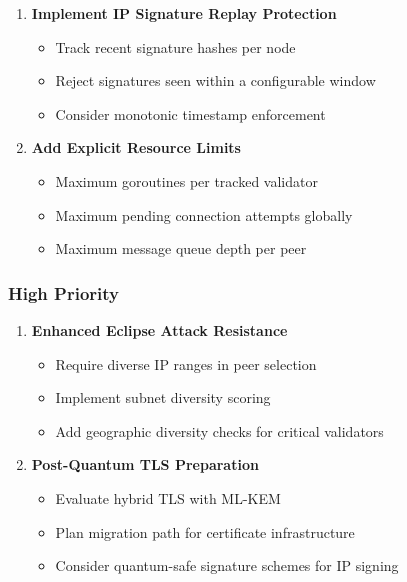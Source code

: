 \documentclass[
]{article}
\providecommand{\tightlist}{%
  \setlength{\itemsep}{0pt}\setlength{\parskip}{0pt}}
\begin{document}
\begin{enumerate}
\def\labelenumi{\arabic{enumi}.}
\item
  \textbf{Implement IP Signature Replay Protection}

  \begin{itemize}
  \tightlist
  \item
    Track recent signature hashes per node
  \item
    Reject signatures seen within a configurable window
  \item
    Consider monotonic timestamp enforcement
  \end{itemize}
\item
  \textbf{Add Explicit Resource Limits}

  \begin{itemize}
  \tightlist
  \item
    Maximum goroutines per tracked validator
  \item
    Maximum pending connection attempts globally
  \item
    Maximum message queue depth per peer
  \end{itemize}
\end{enumerate}

\subsubsection{High Priority}\label{high-priority}

\begin{enumerate}
\def\labelenumi{\arabic{enumi}.}
\setcounter{enumi}{2}
\item
  \textbf{Enhanced Eclipse Attack Resistance}

  \begin{itemize}
  \tightlist
  \item
    Require diverse IP ranges in peer selection
  \item
    Implement subnet diversity scoring
  \item
    Add geographic diversity checks for critical validators
  \end{itemize}
\item
  \textbf{Post-Quantum TLS Preparation}

  \begin{itemize}
  \tightlist
  \item
    Evaluate hybrid TLS with ML-KEM
  \item
    Plan migration path for certificate infrastructure
  \item
    Consider quantum-safe signature schemes for IP signing
  \end{itemize}
\end{enumerate}
\end{document}
